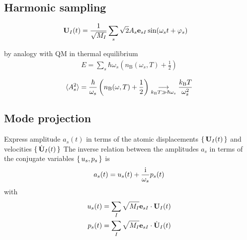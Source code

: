 \subsection{Harmonic sampling}

\begin{align}
	{\bf U}_I (t) 
		& = \frac{1}{\sqrt{M_I}} \sum_s \sqrt 2 A_s {\bf e}_{sI} \sin (\omega_s t + \varphi_s)
\end{align}

by analogy with QM in thermal equilibrium
\begin{align}
	E
		=\sum_{s} \hbar \omega_{s}\left(n_{\mathrm{B}}\left(\omega_{s}, T\right)+\frac{1}{2}\right)
\end{align}

\begin{align}
	\braket{A_{s}^{2}}
		= \frac{\hbar}{\omega_{s}}\left(n_{\mathrm{B}}(\omega, T)+\frac{1}{2}\right)
		\underset{k_{\rm B} T \gg \hbar \omega_s}{\longrightarrow} \frac{k_{\rm B} T}{\omega_s^2}
\end{align}

\subsection{Mode projection}

Express amplitude $a_s (t)$ in terms of the atomic displacements $\set{{\bf U}_I (t)}$ and velocities $\set{\dot{{\bf U}}_I (t)}$ 
The inverse relation between the amplitudes $a_s$ in terms of the conjugate variables $\set{u_s, p_s}$ is
\begin{align}
a_s (t) = u_s (t) + \frac{{\rm i}}{\omega_s} p_s (t)
\end{align}
with
\begin{align}
	u_s (t) 
	    & = \sum_I \sqrt{M_I} \b e_{sI} \cdot \b U_I (t) \\
	p_s (t)
	    & = \sum_I \sqrt{M_I} \b e_{sI} \cdot \dot{\b U}_I (t) %
\end{align}




